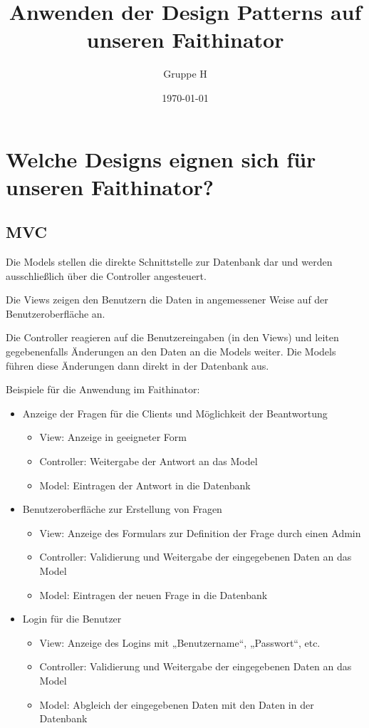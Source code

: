 \documentclass{scrreprt}
\title{Anwenden der Design Patterns auf unseren Faithinator}
\author{Gruppe H}
\date{\today}
\begin{document}
\maketitle
\tableofcontents

\part{Welche Designs eignen sich für unseren Faithinator?}

\chapter{MVC}

Die Models stellen die direkte Schnittstelle zur Datenbank dar und werden ausschließlich über die Controller angesteuert.

Die Views zeigen den Benutzern die Daten in angemessener Weise auf der Benutzeroberfläche an.

Die Controller reagieren auf die Benutzereingaben (in den Views) und leiten gegebenenfalls Änderungen an den Daten an die Models weiter. Die Models führen diese Änderungen dann direkt in der Datenbank aus.

Beispiele für die Anwendung im Faithinator:

\begin{itemize}
\item Anzeige der Fragen für die Clients und Möglichkeit der Beantwortung
   \begin{itemize}
   \item View: Anzeige in geeigneter Form
   \item Controller: Weitergabe der Antwort an das Model
   \item Model: Eintragen der Antwort in die Datenbank
   \end{itemize}
\item Benutzeroberfläche zur Erstellung von Fragen
   \begin{itemize}
   \item View: Anzeige des Formulars zur Definition der Frage durch einen Admin
   \item Controller: Validierung und Weitergabe der eingegebenen Daten an das Model
   \item Model: Eintragen der neuen Frage in die Datenbank
   \end{itemize}

\item Login für die Benutzer
   \begin{itemize}
   \item View: Anzeige des Logins mit „Benutzername“, „Passwort“, etc.
   \item Controller: Validierung und Weitergabe der eingegebenen Daten an das Model
   \item Model: Abgleich der eingegebenen Daten mit den Daten in der Datenbank                                                                           \end{itemize}
\end{itemize}
\end{document}
